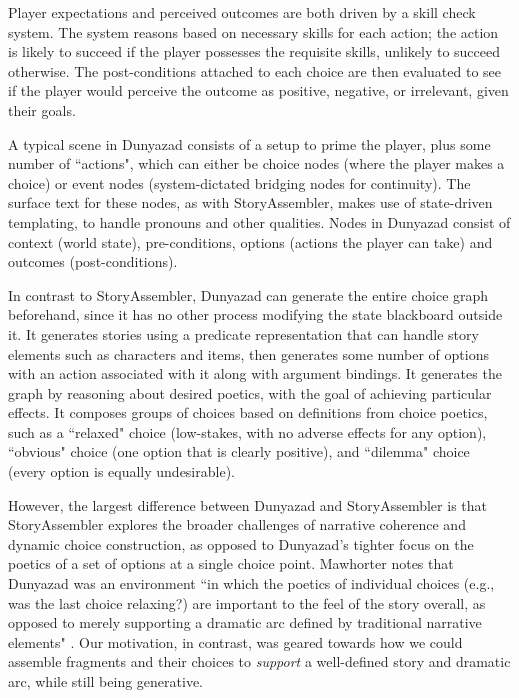 Player expectations and perceived outcomes are both driven by a skill check system. The system reasons based on necessary skills for each action; the action is likely to succeed if the player possesses the requisite skills, unlikely to succeed otherwise. The post-conditions attached to each choice are then evaluated to see if the player would perceive the outcome as positive, negative, or irrelevant, given their goals.

A typical scene in Dunyazad consists of a setup to prime the player, plus some number of ``actions", which can either be choice nodes (where the player makes a choice) or event nodes (system-dictated bridging nodes for continuity). The surface text for these nodes, as with StoryAssembler, makes use of state-driven templating, to handle pronouns and other qualities. Nodes in Dunyazad consist of context (world state), pre-conditions, options (actions the player can take) and outcomes (post-conditions).

In contrast to StoryAssembler, Dunyazad can generate the entire choice graph beforehand, since it has no other process modifying the state blackboard outside it. It generates stories using a predicate representation that can handle story elements such as characters and items, then generates some number of options with an action associated with it along with argument bindings. It generates the graph by reasoning about desired poetics, with the goal of achieving particular effects. It composes groups of choices based on definitions from choice poetics, such as a ``relaxed" choice (low-stakes, with no adverse effects for any option), ``obvious" choice (one option that is clearly positive), and ``dilemma" choice (every option is equally undesirable).

However, the largest difference between Dunyazad and StoryAssembler is that StoryAssembler explores the broader challenges of narrative coherence and dynamic choice construction, as opposed to Dunyazad's tighter focus on the poetics of a set of options at a single choice point. Mawhorter notes that Dunyazad was an environment ``in which the poetics of individual choices (e.g., was the last choice relaxing?) are important to the feel of the story overall, as opposed to merely supporting a dramatic arc defined by traditional narrative elements" \cite{dunyazad}. Our motivation, in contrast, was geared towards how we could assemble fragments and their choices to \textit{support} a well-defined story and dramatic arc, while still being generative.

